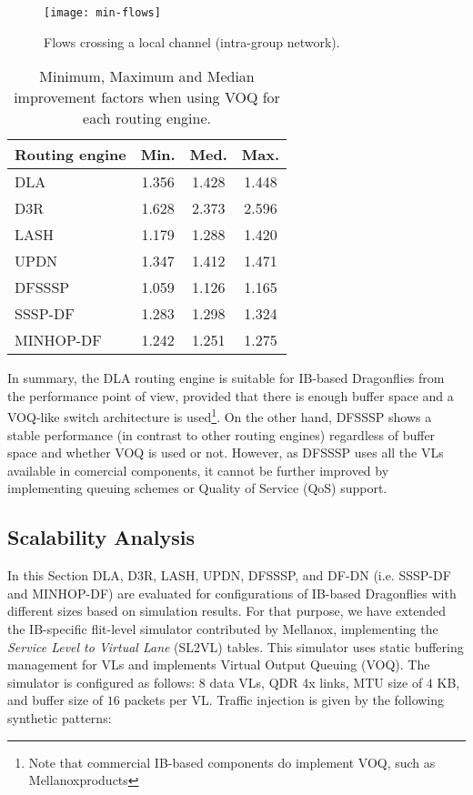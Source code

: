 \documentclass[review]{elsarticle}
\newcommand{\dflys}{Dragonflies}
\newcommand{\ib}{IB}
\begin{document}
\begin{figure}[!htb]
	\centering
	\texttt{[image: min-flows]}
	\caption{Flows crossing a local channel (intra-group network).}
	\label{f:dla-flows}
\end{figure}


\begin{table}[!hptb]
\caption{\small Minimum, Maximum and Median improvement factors when using VOQ for each routing engine.}
\centering
        \begin{tabular}{|l|c|c|c|} \hline
            Routing engine & Min. & Med. & Max.\\ \hline
            DLA            & 1.356	& 1.428	& 1.448 \\
            D3R            & 1.628	& 2.373	& 2.596 \\
            LASH           & 1.179	& 1.288	& 1.420 \\
            UPDN           & 1.347	& 1.412	& 1.471 \\
            DFSSSP         & 1.059	& 1.126	& 1.165 \\
            SSSP-DF        & 1.283	& 1.298	& 1.324 \\
            MINHOP-DF      & 1.242	& 1.251	& 1.275 \\ \hline
        \end{tabular}
        \label{t:voq-ifactors}
\end{table}

In summary, the DLA routing engine  is suitable for \ib-based \dflys{} from the performance point of view,
provided that there is enough buffer space and a VOQ-like switch architecture is used\footnote{Note that commercial \ib-based components do implement VOQ, such as Mellanox\texttrademark products}.
On the other hand, DFSSSP shows a stable performance (in contrast to other routing engines) regardless of buffer space and whether VOQ is used or not.
However, as DFSSSP uses all the VLs available in comercial components, it cannot be further improved by implementing queuing schemes \cite{dbbm_duato2004, h2lq_yebenes2015}
or Quality of Service (QoS) support.


\subsection{Scalability Analysis}
\label{s_sim-experiments}

In this Section DLA, D3R, LASH, UPDN, DFSSSP, and DF-DN (i.e. SSSP-DF and MINHOP-DF) are evaluated for configurations of \ib-based \dflys{} with different sizes based on simulation results.
For that purpose, we have extended the \ib-specific flit-level simulator contributed by Mellanox\texttrademark \cite{maglione2018_d3r},
implementing the \emph{Service Level to Virtual Lane} (SL2VL) tables.
This simulator uses static buffering management for VLs and implements Virtual Output Queuing (VOQ).
The simulator is configured as follows: $8$ data VLs, QDR 4x links, MTU size of $4$ KB, and buffer size of $16$ packets per VL.
Traffic injection is given by the following synthetic patterns:
\end{document}
